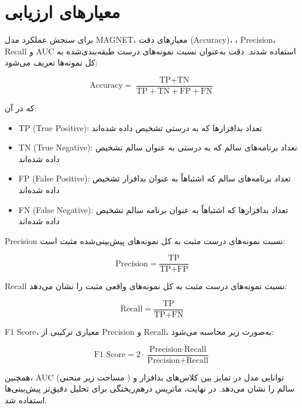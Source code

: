 \section{معیارهای ارزیابی}
برای سنجش عملکرد مدل MAGNET، معیارهای دقت (Accuracy)، ، Precision، Recall و AUC استفاده شدند. دقت به‌عنوان نسبت نمونه‌های درست طبقه‌بندی‌شده به کل نمونه‌ها تعریف می‌شود:

\begin{equation}
\text{Accuracy} = \frac{\text{TP} + \text{TN}}{\text{TP} + \text{TN} + \text{FP} + \text{FN}}
\end{equation}

که در آن:
\begin{itemize}
    \item TP (True Positive): تعداد بدافزارها که به درستی تشخیص داده شده‌اند
    \item TN (True Negative): تعداد برنامه‌های سالم که به درستی به عنوان سالم تشخیص داده شده‌اند
    \item FP (False Positive): تعداد برنامه‌های سالم که اشتباهاً به عنوان بدافزار تشخیص داده شده‌اند
    \item FN (False Negative): تعداد بدافزارها که اشتباهاً به عنوان برنامه سالم تشخیص داده شده‌اند
\end{itemize}

Precision نسبت نمونه‌های درست مثبت به کل نمونه‌های پیش‌بینی‌شده مثبت است:

\begin{equation}
\text{Precision} = \frac{\text{TP}}{\text{TP} + \text{FP}}
\end{equation}

Recall نسبت نمونه‌های درست مثبت به کل نمونه‌های واقعی مثبت را نشان می‌دهد:

\begin{equation}
\text{Recall} = \frac{\text{TP}}{\text{TP} + \text{FN}}
\end{equation}

F1 Score، معیاری ترکیبی از Precision و Recall، به‌صورت زیر محاسبه می‌شود:

\begin{equation}
\text{F1 Score} = 2 \cdot \frac{\text{Precision} \cdot \text{Recall}}{\text{Precision} + \text{Recall}}
\end{equation}

همچنین، AUC (مساحت زیر منحنی ) توانایی مدل در تمایز بین کلاس‌های بدافزار و سالم را نشان می‌دهد. در نهایت، ماتریس درهم‌ریختگی  برای تحلیل دقیق‌تر پیش‌بینی‌ها استفاده شد.

